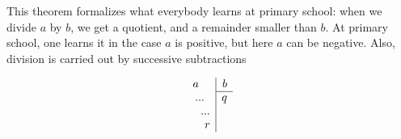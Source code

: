 \documentclass[11pt]{amsbook}
\begin{document}

This theorem formalizes what everybody learns at primary school: when
we divide $a$ by $b$, we get a quotient, and a remainder smaller than $b$. At
primary school, one learns it in the case $a$ is positive, but here $a$ can be
negative. Also, division is carried out by successive subtractions

\[
  \begin{array}{r|r}
     a \phantom{11} & b \\ \cline{2-2}
       ... \phantom{1} & q\\
         ...\\
           r 
  \end{array}
\]
\end{document}
